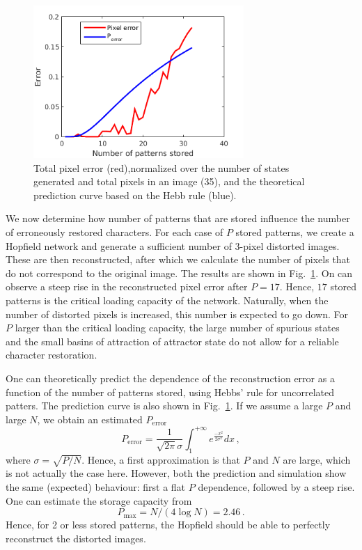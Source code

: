 \documentclass[pdftex,12pt,a4paper]{article}
\begin{document}
\begin{figure}[htb]
\centering
\includegraphics[width=8cm]{figs/Error_ifo_P.png}
\caption{Total pixel error (red),normalized over the number of states generated and total pixels in an image (35), and the theoretical prediction curve based on the Hebb rule (blue).\label{fig:error_ifo_P}}
\end{figure}

We now determine how number of patterns that are stored influence the number of erroneously restored characters. For each case of $P$ stored patterns, we create a Hopfield network and generate a sufficient number of 3-pixel distorted images. These are then reconstructed, after which we calculate the number of pixels that do not correspond to the original image. The results are shown in Fig.~\ref{fig:error_ifo_P}. On can observe a steep rise in the reconstructed pixel error after $P=17$. Hence, $17$ stored patterns is the critical loading capacity of the network. Naturally, when the number of distorted pixels is increased, this number is expected to go down. For $P$ larger than the critical loading capacity, the large number of spurious states and the small basins of attraction of attractor state do not allow for a reliable character restoration.

One can theoretically predict the dependence of the reconstruction error as a function of the number of patterns stored, using Hebbs' rule for uncorrelated patters. The prediction curve is also shown in Fig.~\ref{fig:error_ifo_P}. If we assume a large $P$ and large $N$, we obtain an estimated $P_{\textrm{error}}$
\begin{equation}
P_{\textrm{error}} = \frac{1}{\sqrt{2 \pi} \sigma} \int_{1}^{+\infty} e^{\frac{-x^2}{2 \sigma^2}} dx \,,
\end{equation}
where $\sigma=\sqrt{P/N}$. Hence, a first approximation is that $P$ and $N$ are large, which is not actually the case here. However, both the prediction and simulation show the same (expected) behaviour: first a flat $P$ dependence, followed by a steep rise. One can estimate the storage capacity from
\begin{equation}
P_{\max} = N/(4 \log N) =2.46 \,.
\end{equation}
Hence, for 2 or less stored patterns, the Hopfield should be able to perfectly reconstruct the distorted images.
\end{document}
